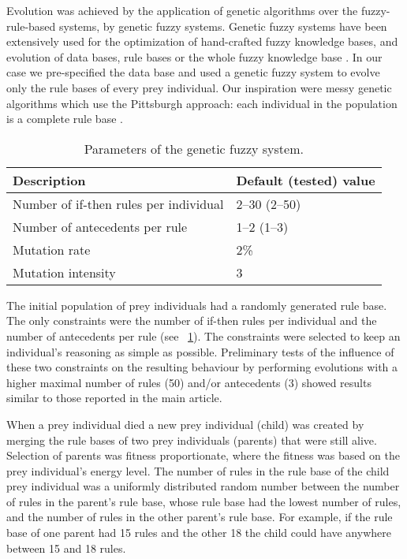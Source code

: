 Evolution was achieved by the application of genetic algorithms over the fuzzy-rule-based systems, \ie by genetic fuzzy systems. Genetic fuzzy systems have been extensively used for the optimization of hand-crafted fuzzy knowledge bases, and evolution of data bases, rule bases or the whole fuzzy knowledge base \cite{cordon2004ten,fernandez2015revisiting,herrera2008genetic}. In our case we pre-specified the data base and used a genetic fuzzy system to evolve only the rule bases of every prey individual. Our inspiration were messy genetic algorithms \cite{goldberg1989messy} which use the Pittsburgh approach: each individual in the population is a complete rule base \cite{hoffman1997evolutionary,smith1980learning}.

\begin{table}
  \caption{Parameters of the genetic fuzzy system.}
  \label{table:ga}
  \begin{tabular}{l l}
    \toprule
    Description & Default (tested) value \\ [0.5ex]
    \midrule
    Number of if-then rules per individual & 2--30 (2--50) \\
    Number of antecedents per rule & 1--2 (1--3) \\
    Mutation rate & 2\% \\ 
    Mutation intensity & 3 \\
    \bottomrule
  \end{tabular}
\end{table}

The initial population of prey individuals had a randomly generated rule base. The only constraints were the number of if-then rules per individual and the number of antecedents per rule (see \tablename~\ref{table:ga}). The constraints were selected to keep an individual's reasoning as simple as possible. Preliminary tests of the influence of these two constraints on the resulting behaviour by performing evolutions with a higher maximal number of rules (50) and/or antecedents (3) showed results similar to those reported in the main article. 

When a prey individual died a new prey individual (child) was created by merging the rule bases of two prey individuals (parents) that were still alive. Selection of parents was fitness proportionate, where the fitness was based on the prey individual's energy level. The number of rules in the rule base of the child prey individual was a uniformly distributed random number between the number of rules in the parent's rule base, whose rule base had the lowest number of rules, and the number of rules in the other parent's rule base. For example, if the rule base of one parent had 15 rules and the other 18 the child could have anywhere between 15 and 18 rules. 

